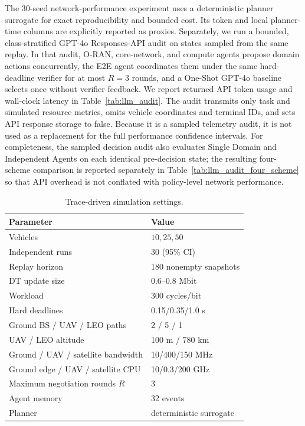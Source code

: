 The 30-seed network-performance experiment uses a deterministic planner
surrogate for exact reproducibility and bounded cost. Its token and local
planner-time columns are explicitly reported as proxies. Separately, we run a
bounded, class-stratified GPT-4o Responses-API audit on states sampled from the
same replay. In that audit, O-RAN, core-network, and compute agents propose
domain actions concurrently, the E2E agent coordinates them under the same
hard-deadline verifier for at most $R=3$ rounds, and a One-Shot GPT-4o baseline
selects once without verifier feedback. We report returned API token usage and
wall-clock latency in Table~\ref{tab:llm_audit}. The audit transmits only task
and simulated resource metrics, omits vehicle coordinates and terminal IDs,
and sets API response storage to false. Because it is a sampled telemetry
audit, it is not used as a replacement for the full performance confidence
intervals.
For completeness, the sampled decision audit also evaluates Single Domain and
Independent Agents on each identical pre-decision state; the resulting
four-scheme comparison is reported separately in
Table~\ref{tab:llm_audit_four_scheme} so that API overhead is not conflated
with policy-level network performance.

\begin{table}[t]
  \centering
  \caption{Trace-driven simulation settings.}
  \label{tab:simulation_setup}
  \renewcommand{\arraystretch}{1.08}
  \begin{tabular}{ll}
    \hline
    Parameter & Value \\
    \hline
    Vehicles & $10,25,50$ \\
    Independent runs & $30$ (95\% CI) \\
    Replay horizon & 180 nonempty snapshots \\
    DT update size & 0.6--0.8 Mbit \\
    Workload & 300 cycles/bit \\
    Hard deadlines & 0.15/0.35/1.0 s \\
    Ground BS / UAV / LEO paths & 2 / 5 / 1 \\
    UAV / LEO altitude & 100 m / 780 km \\
    Ground / UAV / satellite bandwidth & 10/400/150 MHz \\
    Ground edge / UAV / satellite CPU & 10/0.3/200 GHz \\
    Maximum negotiation rounds $R$ & 3 \\
    Agent memory & 32 events \\
    Planner & deterministic surrogate \\
    \hline
  \end{tabular}
\end{table}
